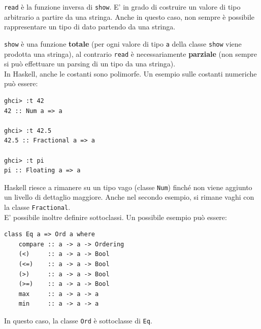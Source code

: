 \documentclass{article}
\begin{document}
\texttt{read} è la funzione inversa di \texttt{show}. E' in grado di costruire un valore di tipo arbitrario a partire da una stringa. Anche in questo caso, non sempre è possibile rappresentare un tipo di dato partendo da una stringa.

\texttt{show} è una funzione \textbf{totale} (per ogni valore di tipo \texttt{a} della classe \texttt{show} viene prodotta una stringa), al contrario \texttt{read} è necessariamente \textbf{parziale} (non sempre si può effettuare un parsing di un tipo da una stringa).\vspace{14pt}\\
In Haskell, anche le costanti sono polimorfe. Un esempio sulle costanti numeriche può essere:
\begin{tcolorbox}
\begin{verbatim}
ghci> :t 42
42 :: Num a => a

ghci> :t 42.5
42.5 :: Fractional a => a

ghci> :t pi
pi :: Floating a => a
\end{verbatim}
\end{tcolorbox}
Haskell riesce a rimanere su un tipo vago (classe \texttt{Num}) finché non viene aggiunto un livello di dettaglio maggiore. Anche nel secondo esempio, si rimane vaghi con la classe \texttt{Fractional}.\vspace{14pt}\\
E' possibile inoltre definire sottoclassi. Un possibile esempio può essere:
\begin{tcolorbox}
\begin{verbatim}
class Eq a => Ord a where
    compare :: a -> a -> Ordering
    (<)     :: a -> a -> Bool
    (<=)    :: a -> a -> Bool
    (>)     :: a -> a -> Bool
    (>=)    :: a -> a -> Bool
    max     :: a -> a -> a
    min     :: a -> a -> a
\end{verbatim}
\end{tcolorbox}
In questo caso, la classe \texttt{Ord} è sottoclasse di \texttt{Eq}.

\pagebreak
\end{document}
